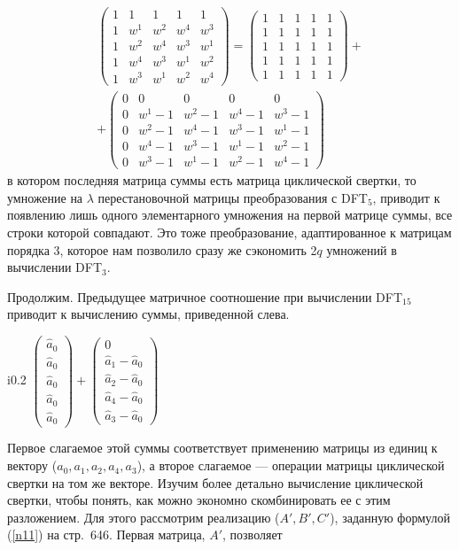 \documentclass{mai_book}
\begin{document}
\begin{multline*}
  \begin{pmatrix} 1 & 1 & 1 & 1 & 1 \\ 1 & w^1 & w^2 & w^4 & w^3 \\ 1 & w^2 & w^4 & w^3 & w^1 \\ 1 & w^4 & w^3 & w^1 & w^2 \\ 1 & w^3 & w^1 & w^2 & w^4 \end{pmatrix} = \begin{pmatrix} 1 & 1 & 1 & 1 & 1 \\ 1 & 1 & 1 & 1 & 1 \\ 1 & 1 & 1 & 1 & 1 \\ 1 & 1 & 1 & 1 & 1 \\ 1 & 1 & 1 & 1 & 1 \end{pmatrix} + \\
  + \begin{pmatrix} 0 & 0 & 0 & 0 & 0 \\ 0 & w^1-1 & w^2-1 & w^4-1 & w^3-1 \\ 0 & w^2-1 & w^4-1 & w^3-1 & w^1-1 \\ 0 & w^4-1 & w^3-1 & w^1-1 & w^2-1 \\ 0 & w^3-1 & w^1-1 & w^2-1 & w^4-1 \end{pmatrix}
  \end{multline*}\noindent
в котором последняя матрица суммы есть матрица циклической свертки, то умножение на $\lambda$ перестановочной матрицы преобразования с D{\footnotesize FT}$_5$, приводит к появлению лишь одного элементарного умножения на первой матрице суммы, все строки которой совпадают. Это тоже преобразование, адаптированное к матрицам порядка 3, которое нам позволило сразу же сэкономить 2$q$ умножений в вычислении D{\footnotesize FT}$_3$.\par 
Продолжим. Предыдущее матричное соотношение при вычислении D{\footnotesize FT}$_{15}$ приводит к вычислению суммы, приведенной слева.
\begin{wrapfigure}{i}{0.2\textwidth}
$\begin{pmatrix} \hat{a}_0 \\ \hat{a}_0 \\ \hat{a}_0 \\ \hat{a}_0 \\ \hat{a}_0 \end{pmatrix} + \begin{pmatrix} 0 \\ \hat{a}_1 - \hat{a}_0 \\ \hat{a}_2 - \hat{a}_0 \\ \hat{a}_4 - \hat{a}_0 \\ \hat{a}_3 - \hat{a}_0 \end{pmatrix}$
  \end{wrapfigure}
Первое слагаемое этой суммы соответствует применению матрицы из единиц к вектору ($a_0,a_1,a_2,a_4,a_3$), а второе слагаемое --- операции матрицы циклической свертки на том же векторе. Изучим более детально вычисление циклической свертки, чтобы понять, как можно экономно скомбинировать ее с этим разложением. Для этого рассмотрим реализацию ($A',B',C'$), заданную формулой (\ref{n11}) на стр.~646. Первая матрица, $A'$, позволяет
\end{document}
